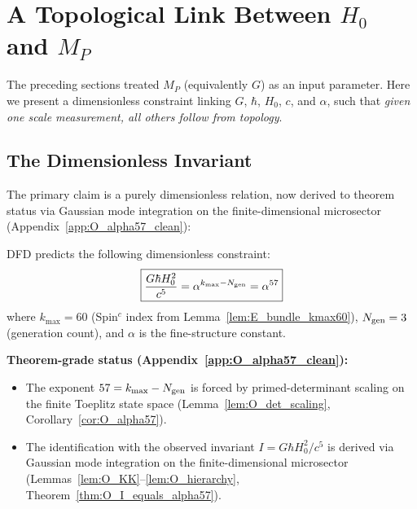 \section{A Topological Link Between $H_0$ and $M_P$}\label{sec:G-derivation}

The preceding sections treated $M_P$ (equivalently $G$) as an input parameter. Here we present a dimensionless constraint linking $G$, $\hbar$, $H_0$, $c$, and $\alpha$, such that \textit{given one scale measurement, all others follow from topology}.

\subsection{The Dimensionless Invariant}

The primary claim is a purely dimensionless relation, now derived to theorem status via Gaussian mode integration on the finite-dimensional microsector (Appendix~\ref{app:O_alpha57_clean}):

\begin{proposition}\label{prop:invariant}
DFD predicts the following dimensionless constraint:
\begin{equation}
\boxed{\frac{G\hbar H_0^2}{c^5} = \alpha^{k_{\max} - N_{\rm gen}} = \alpha^{57}}
\label{eq:invariant}
\end{equation}
where $k_{\max} = 60$ (Spin$^c$ index from Lemma~\ref{lem:E_bundle_kmax60}), $N_{\rm gen} = 3$ (generation count), and $\alpha$ is the fine-structure constant.

\textbf{Theorem-grade status (Appendix~\ref{app:O_alpha57_clean}):}
\begin{itemize}
\item The exponent $57 = k_{\max} - N_{\rm gen}$ is forced by primed-determinant scaling on the finite Toeplitz state space (Lemma~\ref{lem:O_det_scaling}, Corollary~\ref{cor:O_alpha57}).
\item The identification with the observed invariant $I = G\hbar H_0^2/c^5$ is derived via Gaussian mode integration on the finite-dimensional microsector (Lemmas~\ref{lem:O_KK}--\ref{lem:O_hierarchy}, Theorem~\ref{thm:O_I_equals_alpha57}).
\end{itemize}
\end{proposition}


